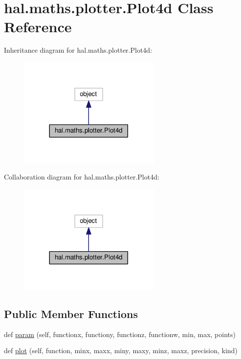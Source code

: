 \hypertarget{classhal_1_1maths_1_1plotter_1_1_plot4d}{}\section{hal.\+maths.\+plotter.\+Plot4d Class Reference}
\label{classhal_1_1maths_1_1plotter_1_1_plot4d}


Inheritance diagram for hal.\+maths.\+plotter.\+Plot4d\+:\nopagebreak
\begin{figure}[H]
\begin{center}
\leavevmode
\includegraphics[width=200pt]{classhal_1_1maths_1_1plotter_1_1_plot4d__inherit__graph}
\end{center}
\end{figure}


Collaboration diagram for hal.\+maths.\+plotter.\+Plot4d\+:\nopagebreak
\begin{figure}[H]
\begin{center}
\leavevmode
\includegraphics[width=200pt]{classhal_1_1maths_1_1plotter_1_1_plot4d__coll__graph}
\end{center}
\end{figure}
\subsection*{Public Member Functions}
\begin{DoxyCompactItemize}
\item 
def \hyperlink{classhal_1_1maths_1_1plotter_1_1_plot4d_a90b39427c236100f8c080e08e2222f2d}{param} (self, functionx, functiony, functionz, functionw, min, max, points)
\item 
def \hyperlink{classhal_1_1maths_1_1plotter_1_1_plot4d_aa776ce05b0f159953ea817402aa9e280}{plot} (self, function, minx, maxx, miny, maxy, minz, maxz, precision, kind)
\end{DoxyCompactItemize}
